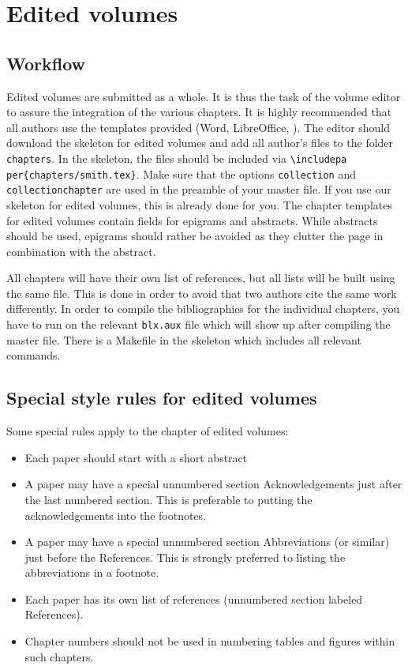\chapter{Edited volumes}
\section{Workflow}
Edited volumes are submitted as a whole. It is thus the task of the volume editor to assure the integration of the various chapters. It is highly recommended that all authors use the templates provided (Word, LibreOffice, \latex). The editor should download the skeleton for edited volumes and add all author's files to the folder \verb+chapters+. In the skeleton, the files should be included via \verb+\includepa+ \verb+per{chapters/smith.tex}+. Make sure that the options \verb+collection+ and \verb+collectionchapter+ are used in the preamble of your master file. If you use our skeleton for edited volumes, this is already done for you. 
The chapter templates for edited volumes contain fields for epigrams and abstracts. While abstracts should be used, epigrams should rather be avoided as they clutter the page in combination with the abstract. 



All chapters will have their own list of references, but all lists will be built using the same {\bibtex} file. This is done in order to avoid that two authors cite the same work differently. In order to compile the bibliographies for the individual chapters, you have to run {\bibtex} on the relevant \verb+blx.aux+ file which will show up after compiling the master file. There is a Makefile in the skeleton which includes all relevant commands.
     
\section{Special style rules for edited volumes}
Some special rules apply to the chapter of edited volumes:
\begin{itemize}
\item Each paper should start with a short abstract
\item A paper may have a special unnumbered section Acknowledgements just after the last numbered section. This is preferable to putting the acknowledgements into the footnotes.
\item A paper may have a special unnumbered section Abbreviations (or similar) just before the References. This is strongly preferred to listing the abbreviations in a footnote.
\item Each paper has its own list of references (unnumbered section labeled References).
\item Chapter numbers should not be used in numbering tables and figures within such chapters.
\end{itemize}